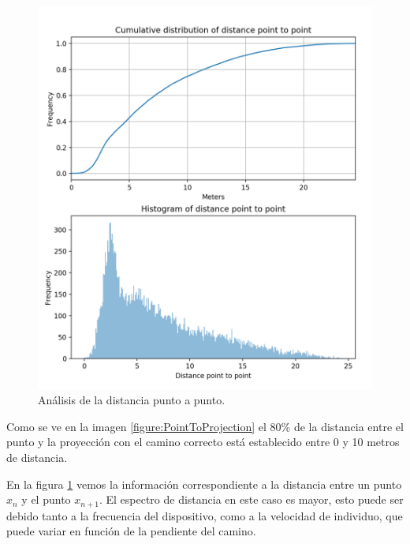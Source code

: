 \begin{figure}[!htb]
\begin{minipage}{0.48\textwidth}
\centering
\includegraphics[width=1.2\textwidth]{./Imagenes/PointToPoint.png}
\caption{Análisis de la distancia punto a punto.}
\label{figure:PointToPoint}
\end{minipage}
\end{figure}
\pagebreak

Como se ve en la imagen \ref{figure:PointToProjection} el 80\% de la distancia entre el punto y la 
proyección con el camino correcto está establecido entre 0 y 10 metros de distancia.

En la figura \ref{figure:PointToPoint} vemos la información correspondiente a la distancia 
entre un punto $x_{n}$ y el punto $x_{n+1}$. El espectro de distancia en este caso es mayor, 
esto puede  ser debido  tanto a la frecuencia del dispositivo, como a la velocidad de individuo, que puede variar en función de la pendiente del camino.